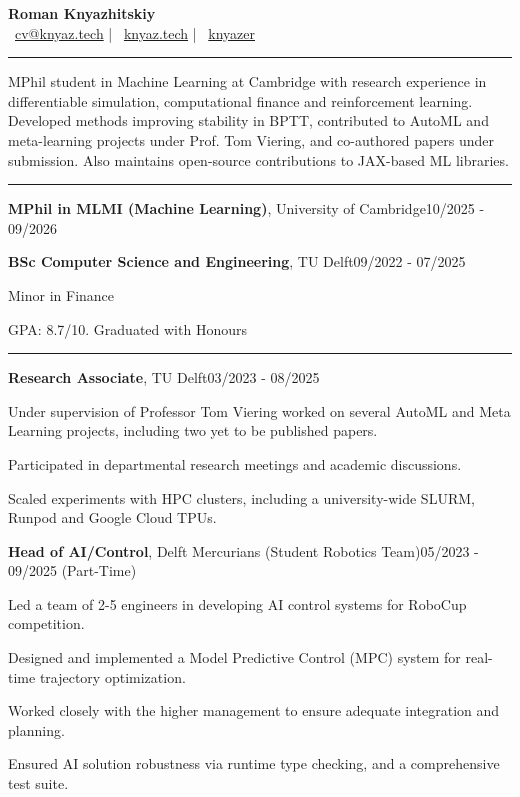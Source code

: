 \documentclass[11pt, a4paper]{article}
\newcommand{\entrytitle}[3]{%
    \noindent\textbf{#1}, #2\hfill#3%
}
\newcommand{\sectiontitle}[1]{\vspace{3mm}{\color{primaryColor}\noindent\textbf{#1}}\vspace{1.5mm}\hrule\vspace{2mm}}
\begin{document}
\begin{center}
    \LARGE{\textbf{\color{primaryColor}Roman Knyazhitskiy}}\\
    \vspace{2mm}
    \normalsize{
        \faEnvelope~\href{mailto:cv@knyaz.tech}{cv@knyaz.tech} \quad|\quad
        \faGlobe~\href{https://knyaz.tech}{knyaz.tech} \quad|\quad
        \faGithub~\href{https://github.com/knyazer}{knyazer}
    }
\end{center}

\sectiontitle{Summary}
\noindent
MPhil student in Machine Learning at Cambridge with research experience in differentiable
simulation, computational finance and reinforcement learning. Developed methods improving stability in
BPTT, contributed to AutoML and meta-learning projects under Prof. Tom Viering, and
co-authored papers under submission. Also maintains open-source contributions to JAX-based ML libraries.

\vspace{-2mm}


\sectiontitle{Education}

\entrytitle{MPhil in MLMI (Machine Learning)}{University of Cambridge}{10/2025 - 09/2026}

\entrytitle{BSc Computer Science and Engineering}{TU Delft}{09/2022 - 07/2025}
\begin{details}
    \item Minor in Finance
    \item GPA: 8.7/10. Graduated with Honours
\end{details}

\vspace{-2mm}


\sectiontitle{Work Experience}

\entrytitle{Research Associate}{TU Delft}{03/2023 - 08/2025}
\begin{details}
    \item Under supervision of Professor Tom Viering worked on several AutoML and Meta Learning
    projects, including two yet to be published papers.
    \item Participated in departmental research meetings and academic discussions.
    \item Scaled experiments with HPC clusters, including a university-wide SLURM, Runpod and Google Cloud TPUs.
\end{details}

\entrytitle{Head of AI/Control}{Delft Mercurians (Student Robotics Team)}{05/2023 - 09/2025 (Part-Time)}
\begin{details}
    \item Led a team of 2-5 engineers in developing AI control systems for RoboCup competition.
    \item Designed and implemented a Model Predictive Control (MPC) system for real-time trajectory optimization.
    \item Worked closely with the higher management to ensure adequate integration and planning.
    \item Ensured AI solution robustness via runtime type checking, and a comprehensive test suite.
\end{details}
\end{document}
